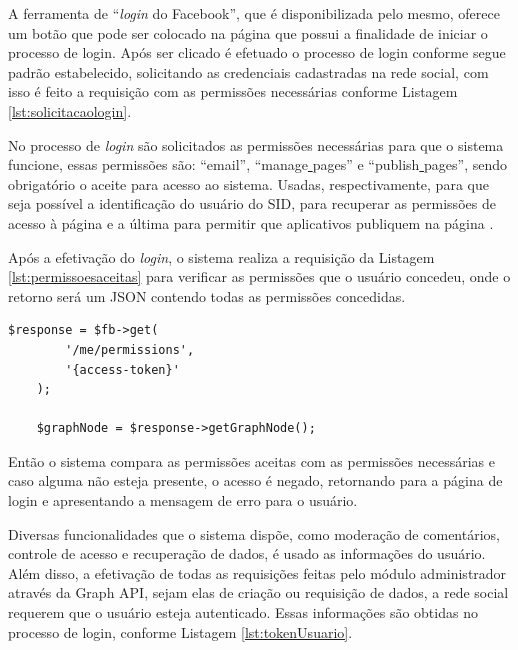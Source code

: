 A ferramenta de ``\textit{login} do Facebook'', que é disponibilizada pelo mesmo, oferece um botão que pode ser colocado na página que possui a finalidade de iniciar o processo de login. Após ser clicado é efetuado o processo de login conforme segue padrão estabelecido, solicitando as credenciais cadastradas na rede social, com isso é feito a requisição com as permissões necessárias conforme Listagem \ref{lst:solicitacaologin}.

No processo de \textit{login} são solicitados as permissões necessárias para que o sistema funcione, essas permissões são: “email”, “manage\underline{{ }}pages” e “publish\underline{{ }}pages”, sendo obrigatório o aceite para acesso ao sistema. Usadas, respectivamente, para que seja possível a identificação do usuário do SID, para recuperar as permissões de acesso à página e a última para permitir que aplicativos publiquem na página \cite{facebook2018a}.

Após a efetivação do \textit{login}, o sistema realiza a requisição da Listagem \ref{lst:permissoesaceitas} para verificar as permissões que o usuário concedeu, onde o retorno será um JSON contendo todas as permissões concedidas.

\begin{lstlisting}[caption={Permissões concedidas},label={lst:permissoesaceitas},float]
  	$response = $fb->get(
    	'/me/permissions',
		'{access-token}'
	);
	
	$graphNode = $response->getGraphNode();
\end{lstlisting}

Então o sistema compara as permissões aceitas com as permissões necessárias e caso alguma não esteja presente, o acesso é negado, retornando para a página de login e apresentando a mensagem de erro para o usuário.

Diversas funcionalidades que o sistema dispõe, como moderação de comentários, controle de acesso e recuperação de dados, é usado as informações do usuário. Além disso, a efetivação de todas as requisições feitas pelo módulo administrador através da Graph API, sejam elas de criação ou requisição de dados, a rede social requerem que o usuário esteja autenticado. Essas informações são obtidas no processo de login, conforme Listagem \ref{lst:tokenUsuario}.


